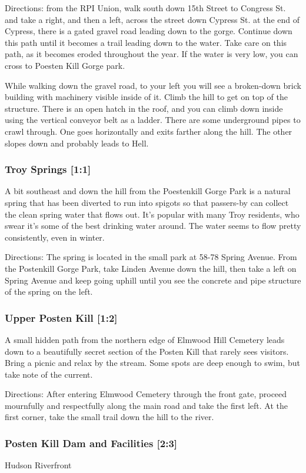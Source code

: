 \documentclass{article}
\begin{document}
Directions: from the RPI Union, walk south down 15th Street to Congress St. and take a right, and then a left, across the street down Cypress St. at the end of Cypress, there is a gated gravel road leading down to the gorge. Continue down this path until it becomes a trail leading down to the water. Take care on this path, as it becomes eroded throughout the year. 
If the water is very low, you can cross to Poesten Kill Gorge park.

While walking down the gravel road, to your left you will see a broken-down brick building with machinery visible inside of it. Climb the hill to get on top of the structure. There is an open hatch in the roof, and you can climb down inside using the vertical conveyor belt as a ladder. There are some underground pipes to crawl through. One goes horizontally and exits farther along the hill. The other slopes down and probably leads to Hell. 
\subsubsection{Troy Springs [1:1]}
A bit southeast and down the hill from the Poestenkill Gorge Park is a natural spring that has been diverted to run into spigots so that passers-by can collect the clean spring water that flows out. It’s popular with many Troy residents, who swear it’s some of the best drinking water around. The water seems to flow pretty consistently, even in winter. 

Directions: The spring is located in the small park at 58-78 Spring Avenue. From the Postenkill Gorge Park, take Linden Avenue down the hill, then take a left on Spring Avenue and keep going uphill until you see the concrete and pipe structure of the spring on the left.
\subsubsection{Upper Posten Kill [1:2]}
A small hidden path from the northern edge of Elmwood Hill Cemetery leads down to a beautifully secret section of the Posten Kill that rarely sees visitors. Bring a picnic and relax by the stream. Some spots are deep enough to swim, but take note of the current.

Directions: After entering Elmwood Cemetery through the front gate, proceed mournfully and respectfully along the main road and take the first left. At the first corner, take the small trail down the hill to the river.
\subsubsection{Posten Kill Dam and Facilities [2:3]}
Hudson Riverfront
\end{document}
